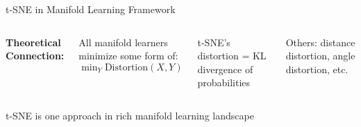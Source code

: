 \documentclass[aspectratio=169]{beamer}
\begin{document}
\begin{frame}{t-SNE in Manifold Learning Framework}
\begin{columns}

\vspace{0.2cm}
\textbf{Theoretical Connection:}

All manifold learners minimize some form of:
  $\min_Y \text{Distortion}(X, Y)$
  
  t-SNE's distortion = KL divergence of probabilities

Others: distance distortion, angle distortion, etc.
\end{columns}

\vspace{0.3cm}
\colorbox{green!20}{\parbox{0.95\textwidth}{\centering t-SNE is one approach in rich manifold learning landscape}}
\end{frame}
\end{document}
